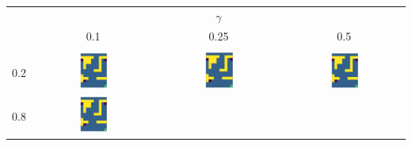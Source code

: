 \begin{center}
    \begin{tabular}{c | c  c  c}
        & & $\gamma$ & \\
        & 0.1 & 0.25 & 0.5 \\
        \hline \\
        0.2 & 
            \includegraphics[width=0.25\textwidth]{assets/dp/analysis/prob_0.1_gamma_0.2_policy.png}
        & 
            \includegraphics[width=0.25\textwidth]{assets/dp/analysis/prob_0.25_gamma_0.2_policy.png}
        & 
            \includegraphics[width=0.25\textwidth]{assets/dp/analysis/prob_0.5_gamma_0.2_policy.png}
        \\
        0.8 &
            \includegraphics[width=0.25\textwidth]{assets/dp/analysis/prob_0.1_gamma_0.8_policy.png}

\end{tabular}
\end{center}
